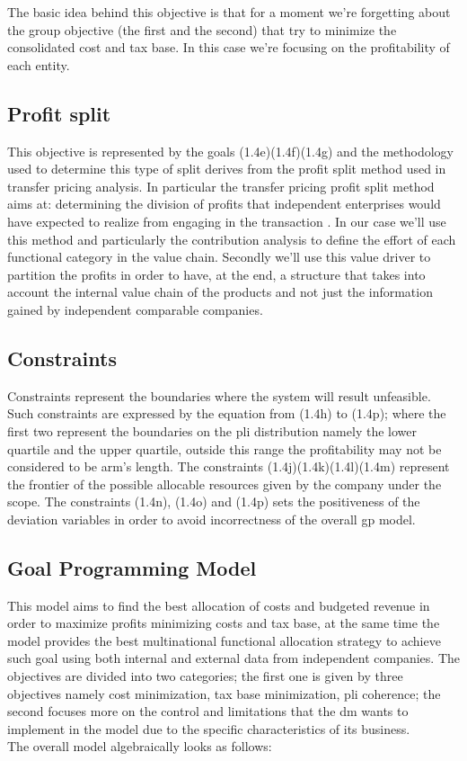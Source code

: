 \begin{doublespace}
The basic idea behind this objective is that for a moment we're forgetting about the group objective (the first and the second) that try to minimize the consolidated cost and tax base. In this case we're focusing on the profitability of each entity.

\subsection{Profit split}
This objective is represented by the goals (1.4e)(1.4f)(1.4g) and the methodology used to determine this type of split derives from the profit split method used in transfer pricing analysis. In particular the transfer pricing profit split method aims at: determining the division of profits that independent enterprises would have expected to realize from engaging in the transaction \cite{OECD_ProfitSplit_2017}. In our case we'll use this method and particularly the contribution analysis to define the effort of each functional category in the value chain. Secondly we'll use this value driver to partition the profits in order to have, at the end, a structure that takes into account the internal value chain of the products and not just the information gained by independent comparable companies.


\subsection{Constraints}
Constraints represent the boundaries where the system will result unfeasible. Such constraints are expressed by the equation from (1.4h) to (1.4p); where the first two represent the boundaries on the \gls{pli} distribution namely the lower quartile and the upper quartile, outside this range the profitability may not be considered to be arm's length. The constraints (1.4j)(1.4k)(1.4l)(1.4m) represent the frontier of the possible allocable resources given by the company under the scope. The constraints (1.4n), (1.4o) and (1.4p) sets the positiveness of the deviation variables in order to avoid incorrectness of the overall \gls{gp} model.

\subsection{Goal Programming Model}

This model aims to find the best allocation of costs and budgeted revenue in order to maximize profits minimizing costs and tax base, at the same time the model provides the best multinational functional allocation strategy to achieve such goal using both internal and external data from independent companies.
The objectives are divided into two categories; the first one is given by three objectives namely cost minimization, tax base minimization, \gls{pli} coherence; the second focuses more on the control and limitations that the \gls{dm} wants to implement in the model due to the specific characteristics of its business.
\\
The overall model algebraically looks as follows:
\\


\end{doublespace}

